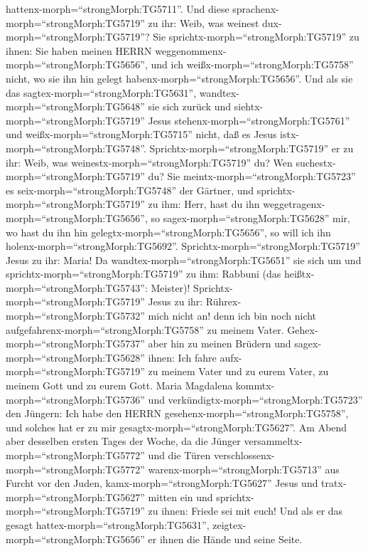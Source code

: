hattenx-morph=``strongMorph:TG5711''.  Und diese
sprachenx-morph=``strongMorph:TG5719'' zu ihr: Weib, was weinest
dux-morph=``strongMorph:TG5719''? Sie
sprichtx-morph=``strongMorph:TG5719'' zu ihnen: Sie haben meinen HERRN
weggenommenx-morph=``strongMorph:TG5656'', und ich
weißx-morph=``strongMorph:TG5758'' nicht, wo sie ihn hin gelegt
habenx-morph=``strongMorph:TG5656''.  Und als sie das
sagtex-morph=``strongMorph:TG5631'',
wandtex-morph=``strongMorph:TG5648'' sie sich zurück und
siehtx-morph=``strongMorph:TG5719'' Jesus
stehenx-morph=``strongMorph:TG5761'' und
weißx-morph=``strongMorph:TG5715'' nicht, daß es Jesus
istx-morph=``strongMorph:TG5748''. 
Sprichtx-morph=``strongMorph:TG5719'' er zu ihr: Weib, was
weinestx-morph=``strongMorph:TG5719'' du? Wen
suchestx-morph=``strongMorph:TG5719'' du? Sie
meintx-morph=``strongMorph:TG5723'' es seix-morph=``strongMorph:TG5748''
der Gärtner, und sprichtx-morph=``strongMorph:TG5719'' zu ihm: Herr,
hast du ihn weggetragenx-morph=``strongMorph:TG5656'', so
sagex-morph=``strongMorph:TG5628'' mir, wo hast du ihn hin
gelegtx-morph=``strongMorph:TG5656'', so will ich ihn
holenx-morph=``strongMorph:TG5692''. 
Sprichtx-morph=``strongMorph:TG5719'' Jesus zu ihr: Maria! Da
wandtex-morph=``strongMorph:TG5651'' sie sich um und
sprichtx-morph=``strongMorph:TG5719'' zu ihm: Rabbuni (das
heißtx-morph=``strongMorph:TG5743'': Meister)! 
Sprichtx-morph=``strongMorph:TG5719'' Jesus zu ihr:
Rührex-morph=``strongMorph:TG5732'' mich nicht an! denn ich bin noch
nicht aufgefahrenx-morph=``strongMorph:TG5758'' zu meinem Vater.
Gehex-morph=``strongMorph:TG5737'' aber hin zu meinen Brüdern und
sagex-morph=``strongMorph:TG5628'' ihnen: Ich fahre
aufx-morph=``strongMorph:TG5719'' zu meinem Vater und zu eurem Vater, zu
meinem Gott und zu eurem Gott.  Maria Magdalena
kommtx-morph=``strongMorph:TG5736'' und
verkündigtx-morph=``strongMorph:TG5723'' den Jüngern: Ich habe den HERRN
gesehenx-morph=``strongMorph:TG5758'', und solches hat er zu mir
gesagtx-morph=``strongMorph:TG5627''.  Am Abend aber
desselben ersten Tages der Woche, da die Jünger
versammeltx-morph=``strongMorph:TG5772'' und die Türen
verschlossenx-morph=``strongMorph:TG5772''
warenx-morph=``strongMorph:TG5713'' aus Furcht vor den Juden,
kamx-morph=``strongMorph:TG5627'' Jesus und
tratx-morph=``strongMorph:TG5627'' mitten ein und
sprichtx-morph=``strongMorph:TG5719'' zu ihnen: Friede sei mit euch!
 Und als er das gesagt hattex-morph=``strongMorph:TG5631'',
zeigtex-morph=``strongMorph:TG5656'' er ihnen die Hände und seine Seite.
